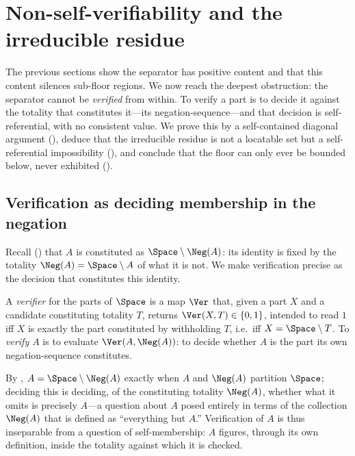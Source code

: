 
\section{Non-self-verifiability and the irreducible residue}
\label{sec:residue}

The previous sections show the separator has positive content and that this
content silences sub-floor regions. We now reach the deepest obstruction: the
separator cannot be \emph{verified} from within. To verify a part is to decide it
against the totality that constitutes it---its negation-sequence---and that
decision is self-referential, with no consistent value. We prove this by a
self-contained diagonal argument (), deduce that the
irreducible residue is not a locatable set but a self-referential impossibility
(), and conclude that the floor can only ever be
bounded below, never exhibited ().

\subsection{Verification as deciding membership in the negation}

Recall () that $A$ is constituted as $\Space\setminus\Neg(A)$:
its identity is fixed by the totality $\Neg(A)=\Space\setminus A$ of what it is
not. We make verification precise as the decision that constitutes this identity.

\begin{definition}[Verifier]
\label{def:verifier}
A \emph{verifier} for the parts of $\Space$ is a map $\Ver$ that, given a part
$X$ and a candidate constituting totality $T$, returns $\Ver(X,T)\in\{0,1\}$,
intended to read $1$ iff $X$ is exactly the part constituted by withholding $T$,
i.e.\ iff $X=\Space\setminus T$. To \emph{verify $A$} is to evaluate
$\Ver(A,\Neg(A))$: to decide whether $A$ is the part its own negation-sequence
constitutes.
\end{definition}

\begin{remark}
\label{rem:ver-membership}
By , $A=\Space\setminus\Neg(A)$ exactly when $A$ and $\Neg(A)$
partition $\Space$; deciding this is deciding, of the constituting totality
$\Neg(A)$, whether what it omits is precisely $A$---a question about $A$ posed
entirely in terms of the collection $\Neg(A)$ that is defined as
``everything but $A$.'' Verification of $A$ is thus inseparable from a question
of self-membership: $A$ figures, through its own definition, inside the totality
against which it is checked.
\end{remark}

